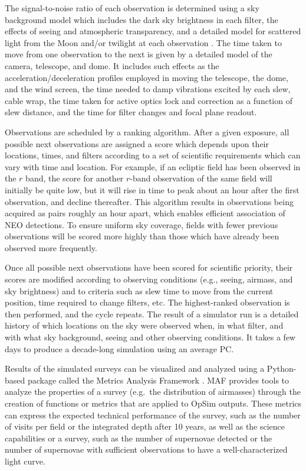 The signal-to-noise ratio of each
observation is determined using a sky background model which includes the dark
sky brightness in each filter, the effects of seeing and atmospheric
transparency, and a detailed model for scattered light from the Moon and/or
twilight at each observation \citep{2016SPIE.9910E..1AY}. The time taken to move from one observation to
the next is given by a detailed model of the camera, telescope, and dome. It
includes such effects as the acceleration/deceleration profiles employed in
moving the telescope, the dome, and the wind screen,
the time needed to damp vibrations excited by each slew,
cable wrap, the time taken for active optics lock and correction as a function of
slew distance, and the time for filter changes and focal plane readout.

Observations are scheduled by a ranking algorithm. After a given exposure, all
possible next observations are assigned a score which depends upon their locations, times,
and filters according to a set of scientific requirements which can vary with
time and location. For example, if an ecliptic field has been observed in the
$r$ band, the score for another $r$-band observation of the same field will
initially be quite low, but it will rise in time to peak about an hour after
the first observation, and decline thereafter. This algorithm results in
observations being acquired as pairs roughly an hour apart, which enables
efficient association of NEO detections. To ensure uniform
sky coverage, fields with fewer previous observations will be scored more
highly than those which have already been observed more frequently.

Once all possible next observations have been scored for scientific
priority, their scores are modified according to observing conditions
(e.g., seeing, airmass, and sky brightness) and to criteria such as
slew time to move from the current position, time required to
change filters, etc. The highest-ranked observation is then performed,
and the cycle repeats. The result of a simulator run is a detailed
history of which locations on the sky were observed when, in what
filter, and with what sky background, seeing and other observing
conditions.  It takes a few days to produce a decade-long simulation
using an average PC.

Results of the simulated surveys can be visualized and analyzed using
a Python-based package called the Metrics Analysis Framework
\citep[MAF;][]{2014SPIE.9149E..0BJ}. MAF provides tools to analyze the properties of a
survey (e.g.\ the distribution of airmasses) through the creation of
functions or metrics that are applied to OpSim outputs. These metrics
can express the expected technical performance of the survey, such as
the number of visits per field or the integrated depth after 10 years,
as well as the science capabilities or a survey, such as the number of
supernovae detected or the number of supernovae with sufficient
observations to have a well-characterized light curve.

